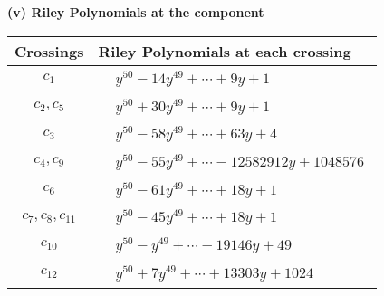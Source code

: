 \documentclass[1p]{elsarticle_modified}
\theoremstyle{definition}
\begin{document}
\newpage\renewcommand{\arraystretch}{1}
\flushleft \textbf{(v) Riley Polynomials at the component}\newline \\
\begin{tabular}{m{50pt}|m{274pt}}
Crossings & \hspace{64pt}Riley Polynomials at each crossing \\
\hline $$\begin{aligned}c_{1}\end{aligned}$$&$\begin{aligned}
&y^{50}-14 y^{49}+\cdots+9 y+1
\end{aligned}$\\
\hline $$\begin{aligned}c_{2},c_{5}\end{aligned}$$&$\begin{aligned}
&y^{50}+30 y^{49}+\cdots+9 y+1
\end{aligned}$\\
\hline $$\begin{aligned}c_{3}\end{aligned}$$&$\begin{aligned}
&y^{50}-58 y^{49}+\cdots+63 y+4
\end{aligned}$\\
\hline $$\begin{aligned}c_{4},c_{9}\end{aligned}$$&$\begin{aligned}
&y^{50}-55 y^{49}+\cdots-12582912 y+1048576
\end{aligned}$\\
\hline $$\begin{aligned}c_{6}\end{aligned}$$&$\begin{aligned}
&y^{50}-61 y^{49}+\cdots+18 y+1
\end{aligned}$\\
\hline $$\begin{aligned}c_{7},c_{8},c_{11}\end{aligned}$$&$\begin{aligned}
&y^{50}-45 y^{49}+\cdots+18 y+1
\end{aligned}$\\
\hline $$\begin{aligned}c_{10}\end{aligned}$$&$\begin{aligned}
&y^{50}- y^{49}+\cdots-19146 y+49
\end{aligned}$\\
\hline $$\begin{aligned}c_{12}\end{aligned}$$&$\begin{aligned}
&y^{50}+7 y^{49}+\cdots+13303 y+1024
\end{aligned}$\\
\hline
\end{tabular}\\~\\
\end{document}
